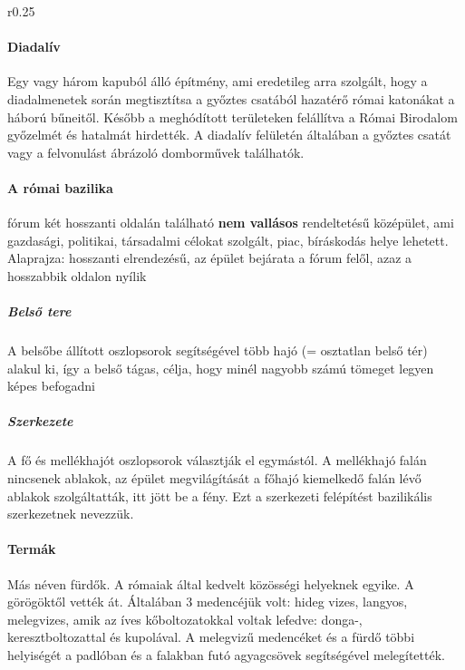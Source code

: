 \begin{wrapfigure}{r}{0.25\textwidth}
\end{wrapfigure}

\paragraph{Diadalív}
Egy vagy három kapuból álló építmény, ami eredetileg arra szolgált, hogy a diadalmenetek során megtisztítsa a győztes csatából hazatérő római katonákat a háború bűneitől. Később a meghódított területeken felállítva a Római Birodalom győzelmét és hatalmát hirdették. A diadalív felületén általában a győztes csatát vagy a felvonulást ábrázoló domborművek találhatók.

\paragraph{A római bazilika}
fórum két hosszanti oldalán található \textbf{nem vallásos} rendeltetésű középület, ami gazdasági, politikai, társadalmi célokat szolgált, piac, bíráskodás helye lehetett.
Alaprajza: hosszanti elrendezésű, az épület bejárata a fórum felől, azaz a hosszabbik oldalon nyílik

\subparagraph{Belső tere} A belsőbe állított oszlopsorok segítségével több hajó (= osztatlan belső tér) alakul ki, így a belső tágas, célja, hogy minél nagyobb számú tömeget legyen képes befogadni

\subparagraph{Szerkezete} A fő és mellékhajót oszlopsorok választják el egymástól. A mellékhajó falán nincsenek ablakok, az épület megvilágítását a főhajó kiemelkedő falán lévő ablakok szolgáltatták, itt jött be a fény. Ezt a szerkezeti felépítést bazilikális szerkezetnek nevezzük.

\paragraph{Termák}
Más néven fürdők. A rómaiak által kedvelt közösségi helyeknek egyike. A görögöktől vették át. Általában 3 medencéjük volt: hideg vizes, langyos, melegvizes, amik az íves kőboltozatokkal voltak lefedve: donga-, keresztboltozattal és kupolával. A melegvizű medencéket és a fürdő többi helyiségét a padlóban és a falakban futó agyagcsövek segítségével melegítették.

